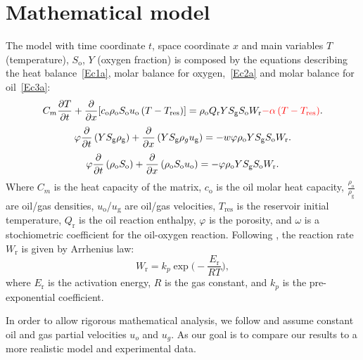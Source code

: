 \section{Mathematical model}

The model with time coordinate $t$, space coordinate $x$ and
main variables $T$ (temperature), $S_{\text{o}}$, $Y$ (oxygen
fraction) is composed by the equations describing the heat
balance~\eqref{Ec1a}, molar balance for oxygen,~\eqref{Ec2a} and
molar balance for oil~\eqref{Ec3a}:
\begin{equation}
	C_{m}\diffp{T}{t}+
	\diffp*{[c_{\text{o}}\rho_{\text{o}}S_{\text{o}}u_{\text{o}}\left(T-T_{\text{res}}\right)]}{x}=
	\rho_{\text{o}}Q_{\text{r}}YS_\text{g}S_{\text{o}}W_{\text{r}}
	\textcolor{red}{-\alpha\left(T-T_{\text{res}}\right)}.
	\label{Ec1a}
\end{equation}
\begin{equation}
	\varphi
	\diffp*{\left(YS_\text{g}\rho_{\text{g}}\right)}{t}+
	\diffp*{\left(YS_\text{g}\rho_{g}u_{\text{g}}\right)}{x}=
	-w\varphi
	\rho_{\text{o}}YS_\text{g}S_{\text{o}}W_{\text{r}}.
	\label{Ec2a}
\end{equation}
\begin{equation}
	\varphi
	\diffp*{\left(\rho_{\text{o}}S_{\text{o}}\right)}{t}+
	\diffp*{\left(\rho_{\text{o}}S_{\text{o}}u_{\text{o}}\right)}{x}=
	-\varphi\rho_{\text{o}}YS_\text{g}S_{\text{o}}W_{\text{r}}.
	\label{Ec3a}
\end{equation}
Where $C_{m}$ is the heat capacity of the matrix, $c_{\text{o}}$ is
the oil molar heat capacity, $\frac{\rho_{\text{o}}}{\rho_{\text{g}}}$
are oil/gas densities, $u_{\text{o}}$/$u_{\text{g}}$ are oil/gas
velocities, $T_{\text{res}}$ is the reservoir initial temperature,
$Q_{\text{r}}$ is the oil reaction enthalpy, $\varphi$ is the
porosity, and $\omega$ is a stochiometric coefficient for the
oil-oxygen reaction.
Following \cite{traveling,gargar2020combustion}, the reaction rate
$W_{\text{r}}$ is given by Arrhenius law:
\begin{equation}
	W_{\text{r}}=
	k_{p}\exp
	\Big(-\frac{E_\text{r}}{RT}\Big),
	\label{Ec4a}
\end{equation}
where $E_\text{r}$ is the activation energy, $R$ is the gas constant,
and $k_{p}$ is the pre-exponential coefficient.

In order to allow rigorous mathematical analysis, we follow
\cite{traveling,chapiro2012asymptotic,chapiro2014combustion,zavala2020classification,chapiro2015combustion} and assume constant oil and gas partial velocities $u_o$ and $u_g$.
As our goal is to compare our results to a more realistic model and experimental data.

